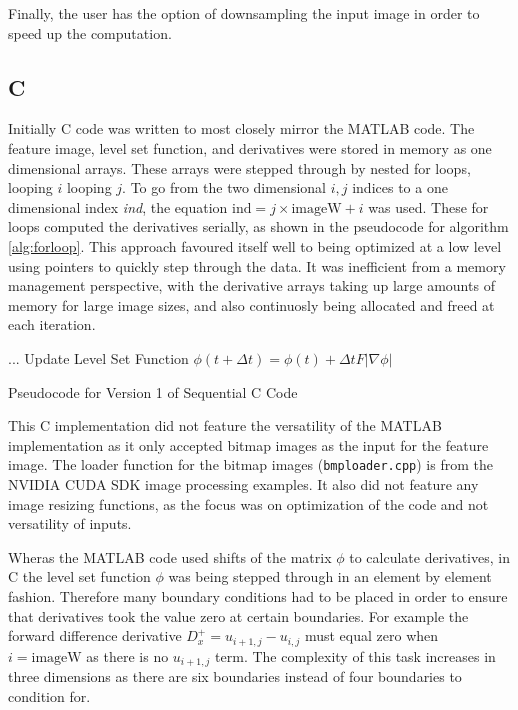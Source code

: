 Finally, the user has the option of downsampling the input image in order to speed up the computation.

	\subsection{C}
Initially C code was written to most closely mirror the MATLAB code. The feature image, level set function, and derivatives were stored in memory as one dimensional arrays. These arrays were stepped through by nested for loops, looping $i$ looping $j$. To go from the two dimensional $i,j$ indices to a one dimensional index \textit{ind}, the equation $\textrm{ind} = j \times \textrm{imageW} +i$ was used. These for loops computed the derivatives serially, as shown in the pseudocode for algorithm \ref{alg:forloop}. This approach favoured itself well to being optimized at a low level using pointers to quickly step through the data. It was inefficient from a memory management perspective, with the derivative arrays taking up large amounts of memory for large image sizes, and also continuosly being allocated and freed at each iteration.

\begin{algorithm}[h]
\dontprintsemicolon
{}
\BlankLine
...\;
\BlankLine
Update Level Set Function $\phi(t+\Delta t) =\phi(t) + \Delta t F|\nabla\phi|$\;
\caption{Pseudocode for Version 1 of Sequential C Code}\label{alg:forloop}
\end{algorithm}

This C implementation did not feature the versatility of the MATLAB implementation as it only accepted bitmap images as the input for the feature image. The loader function for the bitmap images (\texttt{bmploader.cpp}) is from the NVIDIA CUDA SDK image processing examples. It also did not feature any image resizing functions, as the focus was on optimization of the code and not versatility of inputs.

Wheras the MATLAB code used shifts of the matrix $\phi$ to calculate derivatives, in C the level set function $\phi$ was being stepped through in an element by element fashion. Therefore many boundary conditions had to be placed in order to ensure that derivatives took the value zero at certain boundaries. For example the forward difference derivative $D_x^+ =u_{i+1,j}-u_{i,j}$ must equal zero when $i=\textrm{imageW}$ as there is no $u_{i+1,j}$ term. The complexity of this task increases in three dimensions as there are six boundaries instead of four boundaries to condition for.


